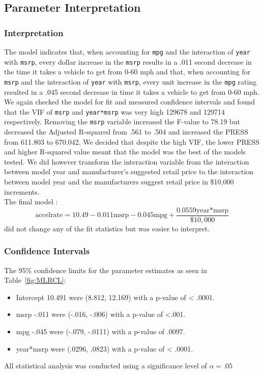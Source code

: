 \documentclass[acmsmall]{acmart}
\begin{document}
\subsection{Parameter Interpretation}
\subsubsection{Interpretation}
The model indicates that, when accounting for \texttt{mpg} and the interaction of \texttt{year} with \texttt{msrp}, every dollar increase in the \texttt{msrp} results in a .011 second decrease in the time it takes a vehicle to get from 0-60 mph and that, when accounting for \texttt{msrp} and the interaction of \texttt{year} with \texttt{msrp}, every unit increase in the \texttt{mpg} rating resulted in a .045 second decrease in time it takes a vehicle to get from 0-60 mph. We again checked the model for fit and measured confidence intervals and found that the VIF of \texttt{msrp} and \texttt{year*msrp} was very high 129678 and 129714 respectively. Removing the \texttt{msrp} variable increased the F-value to 78.19 but decreased the Adjusted R-squared from .561 to .504 and increased the PRESS from 611.803 to 670.042. We decided that despite the high VIF, the lower PRESS and higher R-squared value meant that the model was the best of the models tested. We did however transform the interaction variable from the interaction between model year and manufacturer’s suggested retail price to the interaction between model year and the manufacturers suggest retail price in \$10,000 increments.\\
 The final model :
$$ \text{accelrate} = 10.49 - 0.011 \text{msrp} - 0.045 \text{mpg} + \frac{0.0559 \text{year*msrp}}{\$10,000} $$
 did not change any of the fit statistics but was easier to interpret.
\subsubsection{Confidence Intervals}
The 95\% confidence limits for the parameter estimates as seen in Table~\ref{fig:MLRCL}:\\
\begin{itemize}
\item[] Intercept 10.491 were (8.812, 12.169) with a p-value of < .0001.
\item[] msrp -.011 were (-.016, -.006) with a p-value of <.001.
\item[] mpg -.045 were (-.079, -.0111) with a p-value of .0097.
\item[] year*msrp were (.0296, .0823) with a p-value of < .0001.
\end{itemize} 
All statistical analysis was conducted using a significance level of $\alpha = .05$ 
\end{document}
